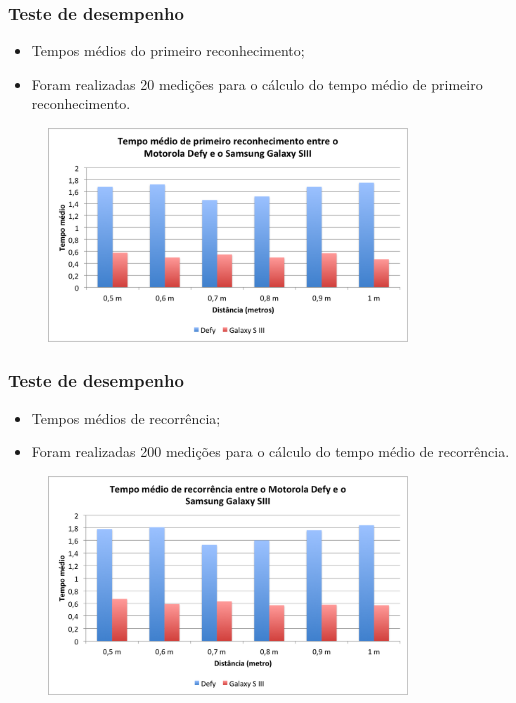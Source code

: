 \documentclass{beamer}
\begin{document}
	\begin{frame}
		\frametitle{Teste de desempenho}
		
		\begin{itemize}
		  \item Tempos médios do primeiro reconhecimento;
		  \item Foram realizadas 20 medições para o cálculo do tempo médio de primeiro reconhecimento. 
		\end{itemize}
		
				
		\begin{figure}[htb]
			\begin{center}
					\includegraphics[width=0.85\textwidth]{figuras/grafico_des_primeiro.png}
			\end{center}
		\end{figure}
	\end{frame}
	
	\begin{frame}
		\frametitle{Teste de desempenho}
		
		\begin{itemize}
			\item Tempos médios de recorrência;
			\item Foram realizadas 200 medições para o cálculo do tempo médio de recorrência.
		\end{itemize}
				
		\begin{figure}[htb]
			\begin{center}
					\includegraphics[width=0.85\textwidth]{figuras/grafico_des_recorrencia.png}
			\end{center}
		\end{figure}
	\end{frame}
	
\end{document}
